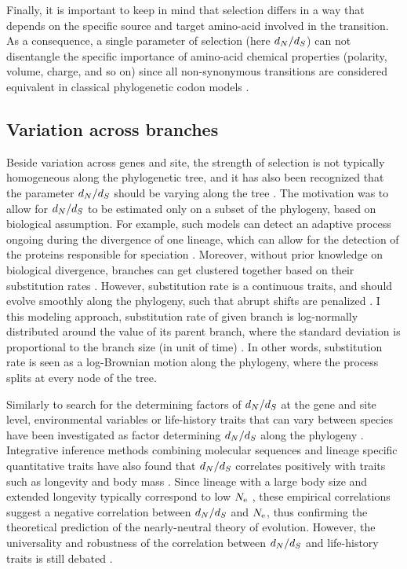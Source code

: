 Finally, it is important to keep in mind that selection differs in a way that depends on the specific source and target amino-acid involved in the {transition}.
As a consequence, a single parameter of selection (here $d_N / d_S$) can not disentangle the specific importance of amino-acid chemical properties (polarity, volume, charge, and so on) since all non-synonymous {transitions} are considered equivalent in classical phylogenetic \gls{codon} models \citep{Dutheil2008}.

\subsection{Variation across branches}

Beside variation across genes and site, the strength of selection is not typically homogeneous along the phylogenetic tree, and it has also been recognized that the parameter $d_N / d_S$ should be varying along the tree \citep{Yang1998}.
The motivation was to allow for $d_N / d_S$ to be estimated only on a subset of the phylogeny, based on biological assumption.
For example, such models can detect an adaptive process ongoing during the divergence of one lineage, which can allow for the detection of the proteins responsible for speciation \citep{Yang2001, Zhang2004}.
Moreover, without \gls{prior} knowledge on biological divergence, branches can get clustered together based on their \gls{substitution} rates \citep{Dutheil2012a}.
However, \gls{substitution} rate is a continuous traits, and should evolve smoothly along the phylogeny, such that abrupt shifts are penalized \citep{Huelsenbeck2003,Seo2004}.
I this modeling approach, \gls{substitution} rate of given branch is log-normally distributed around the value of its parent branch, where the standard deviation is proportional to the branch size (in unit of time) \citep{Lartillot2011, Brevet2019}.
In other words, \gls{substitution} rate is seen as a log-Brownian motion along the phylogeny, where the process splits at every node of the tree. 

Similarly to search for the determining factors of $d_N / d_S$ at the gene and site level, environmental variables or life-history traits that can vary between species have been investigated as factor determining $d_N / d_S$ along the phylogeny \citep{Felsenstein1985,Romiguier2014}.
Integrative inference methods combining molecular sequences and lineage specific quantitative traits have also found that $d_N / d_S$ correlates positively with traits such as longevity and body mass \citep{Lartillot2011, Figuet2017}.
Since lineage with a large body size and extended longevity typically correspond to low $N_{\textrm{e}}$ \citep{Romiguier2014}, these empirical correlations suggest a negative correlation between $d_N / d_S$ and $N_{\textrm{e}}$, thus confirming the theoretical prediction of the \gls{nearly-neutral} theory of evolution.
However, the universality and robustness of the correlation between $d_N / d_S$ and life-history traits is still debated \citep{Nabholz2013, Lanfear2014, Figuet2016}.

